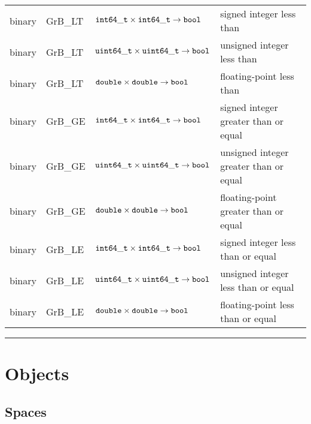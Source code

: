 \documentclass[11pt]{extarticle}
\begin{document}
\begin{table}
\begin{center}
\begin{tabular}{l|l|l|l}
binary		& {\sf GrB\_LT}		& ${\tt int64\_t} \times {\tt int64\_t} \rightarrow {\tt bool}$		& signed integer less than  \\
binary		& {\sf GrB\_LT}		& ${\tt uint64\_t} \times {\tt uint64\_t} \rightarrow {\tt bool}$ 	& unsigned integer less than  \\
binary		& {\sf GrB\_LT}		& ${\tt double} \times {\tt double} \rightarrow {\tt bool}$ 		& floating-point less than  \\
binary		& {\sf GrB\_GE}		& ${\tt int64\_t} \times {\tt int64\_t} \rightarrow {\tt bool}$		& signed integer greater than or equal \\
binary		& {\sf GrB\_GE}		& ${\tt uint64\_t} \times {\tt uint64\_t} \rightarrow {\tt bool}$ 	& unsigned integer greater than or equal \\
binary		& {\sf GrB\_GE}		& ${\tt double} \times {\tt double} \rightarrow {\tt bool}$ 		& floating-point greater than or equal \\
binary		& {\sf GrB\_LE}		& ${\tt int64\_t} \times {\tt int64\_t} \rightarrow {\tt bool}$		& signed integer less than or equal \\
binary		& {\sf GrB\_LE}		& ${\tt uint64\_t} \times {\tt uint64\_t} \rightarrow {\tt bool}$ 	& unsigned integer less than or equal \\
binary		& {\sf GrB\_LE}		& ${\tt double} \times {\tt double} \rightarrow {\tt bool}$ 		& floating-point less than or equal \\
\end{tabular}
\end{center}
\hrule
\end{table}

\section{Objects}

\subsection{Spaces}

\end{document}
